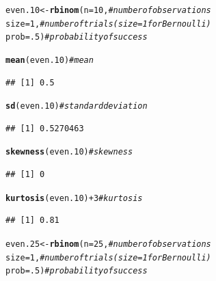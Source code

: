 \documentclass{article}\usepackage[]{graphicx}\usepackage[]{color}
\makeatletter
\newcommand{\hlnum}[1]{\textcolor[rgb]{0.686,0.059,0.569}{#1}}%
\newcommand{\hlcom}[1]{\textcolor[rgb]{0.678,0.584,0.686}{\textit{#1}}}%
\newcommand{\hlopt}[1]{\textcolor[rgb]{0,0,0}{#1}}%
\newcommand{\hlstd}[1]{\textcolor[rgb]{0.345,0.345,0.345}{#1}}%
\newcommand{\hlkwb}[1]{\textcolor[rgb]{0.69,0.353,0.396}{#1}}%
\newcommand{\hlkwc}[1]{\textcolor[rgb]{0.333,0.667,0.333}{#1}}%
\newcommand{\hlkwd}[1]{\textcolor[rgb]{0.737,0.353,0.396}{\textbf{#1}}}%
\newenvironment{kframe}{%
 \def\at@end@of@kframe{}%
 \ifinner\ifhmode%
  \def\at@end@of@kframe{\end{minipage}}%
  \begin{minipage}{\columnwidth}%
 \fi\fi%
 \def\FrameCommand##1{\hskip\@totalleftmargin \hskip-\fboxsep
 \colorbox{shadecolor}{##1}\hskip-\fboxsep
     \hskip-\linewidth \hskip-\@totalleftmargin \hskip\columnwidth}%
 \MakeFramed {\advance\hsize-\width
   \@totalleftmargin\z@ \linewidth\hsize
   \@setminipage}}%
 {\par\unskip\endMakeFramed%
 \at@end@of@kframe}
\newenvironment{knitrout}{}{} %
\makeatother
\begin{document}
\begin{enumerate}
\begin{enumerate}
\begin{knitrout}
\begin{kframe}
\begin{alltt}
\hlstd{even.10} \hlkwb{<-} \hlkwd{rbinom}\hlstd{(}\hlkwc{n}\hlstd{=}\hlnum{10}\hlstd{,}          \hlcom{#number of observations}
              \hlkwc{size}\hlstd{=}\hlnum{1}\hlstd{,}            \hlcom{#number of trials (size=1 for Bernoulli)}
              \hlkwc{prob}\hlstd{=}\hlnum{.5}\hlstd{)}           \hlcom{#probability of success}

\hlkwd{mean}\hlstd{(even.10)}                    \hlcom{#mean}
\end{alltt}
\begin{verbatim}
## [1] 0.5
\end{verbatim}
\begin{alltt}
\hlkwd{sd}\hlstd{(even.10)}                      \hlcom{#standard deviation}
\end{alltt}
\begin{verbatim}
## [1] 0.5270463
\end{verbatim}
\begin{alltt}
\hlkwd{skewness}\hlstd{(even.10)}                \hlcom{#skewness}
\end{alltt}
\begin{verbatim}
## [1] 0
\end{verbatim}
\begin{alltt}
\hlkwd{kurtosis}\hlstd{(even.10)}\hlopt{+}\hlnum{3}              \hlcom{#kurtosis}
\end{alltt}
\begin{verbatim}
## [1] 0.81
\end{verbatim}
\begin{alltt}
\hlstd{even.25}  \hlkwb{<-} \hlkwd{rbinom}\hlstd{(}\hlkwc{n}\hlstd{=}\hlnum{25}\hlstd{,}         \hlcom{#number of observations}
              \hlkwc{size}\hlstd{=}\hlnum{1}\hlstd{,}            \hlcom{#number of trials (size=1 for Bernoulli)}
              \hlkwc{prob}\hlstd{=}\hlnum{.5}\hlstd{)}           \hlcom{#probability of success}


\end{alltt}
\end{kframe}
\end{knitrout}
\end{enumerate}
\end{enumerate}
\end{document}
